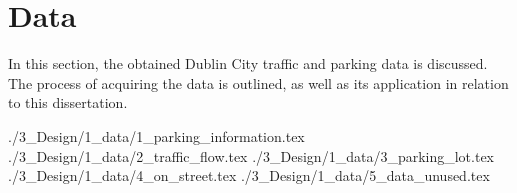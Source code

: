 \section{Data}\label{sec:design_data}
In this section, the obtained Dublin City traffic and parking data is discussed. The process of acquiring the data is outlined, as well as its application in relation to this dissertation.

{./3_Design/1_data/1_parking_information.tex}
{./3_Design/1_data/2_traffic_flow.tex}
{./3_Design/1_data/3_parking_lot.tex}
{./3_Design/1_data/4_on_street.tex}
{./3_Design/1_data/5_data_unused.tex}